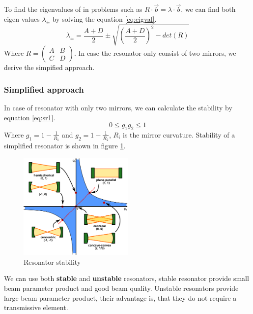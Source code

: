 To find the eigenvalues of in problems such as $R \cdot \vec{b} = \lambda \cdot \vec{b}$, we can find both eigen values $\lambda_{\pm}$ by solving the equation \ref{eq:eigval}.
\begin{equation}
    \lambda_{\pm} = \frac{A + D}{2} \pm \sqrt{(\frac{A+D}{2})^2 - det(R)}
    \label{eq:eigval}
\end{equation}
Where $R = \begin{pmatrix}
    A & B \\ C&D
\end{pmatrix}$. In case the resonator only consist of two mirrors, we derive the simpified approach.

\subsubsection{Simplified approach}
In case of resonator with only two mirrors, we can calculate the stability by equation \ref{eq:sr1}.
\begin{equation}
    0 \le g_1 g_2 \le 1
    \label{eq:sr1}
\end{equation}
Where $g_1 = 1 - \frac{1}{R_1}$ and $g_2 = 1 - \frac{1}{R_2}$, $R_i$ is the mirror curvature.
\newpage
Stability of a simplified resonator is shown in figure \ref{fig:slr}.
\begin{figure}[h!]
    \centering
    \includegraphics[width=0.5\textwidth]{slike/Laser_resonator_stability.png}
    \caption{Resonator stability}
    \label{fig:slr}
\end{figure}

We can use both \textbf{stable} and \textbf{unstable} resonators, stable resonator provide small beam parameter product and good beam quality.
Unstable resonators provide large beam parameter product, their advantage is, that they do not require a transmissive element.